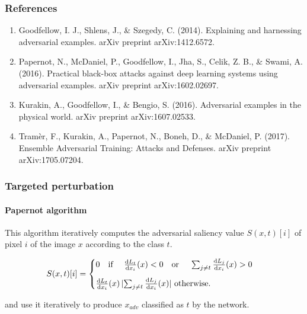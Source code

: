 \documentclass[9pt]{beamer}
\begin{document}
\begin{frame}
  \frametitle{References}

  {\footnotesize
    \begin{enumerate}
    \item Goodfellow, I. J., Shlens, J., \& Szegedy,
      C. (2014). Explaining and harnessing adversarial
      examples. arXiv preprint arXiv:1412.6572.
    \item Papernot, N., McDaniel, P., Goodfellow, I., Jha, S., Celik,
      Z. B., \& Swami, A. (2016). Practical black-box attacks against
      deep learning systems using adversarial examples. arXiv preprint
      arXiv:1602.02697.
    \item Kurakin, A., Goodfellow, I., \& Bengio,
      S. (2016). Adversarial examples in the physical world. arXiv
      preprint arXiv:1607.02533.
    \item Tramèr, F., Kurakin, A., Papernot, N., Boneh, D., \&
      McDaniel, P. (2017). Ensemble Adversarial Training: Attacks and
      Defenses. arXiv preprint arXiv:1705.07204.
    \end{enumerate}
  }

\end{frame}

\appendix

\begin{frame}
  \frametitle{Targeted perturbation}

  \framesubtitle{Papernot algorithm}

  This algorithm iteratively computes the adversarial saliency value
  $S(x, t)[i]$ of pixel $i$ of the image $x$ according to the class
  $t$.

  \medskip

  \[
  S(x, t)[i] =
  \begin{cases}
    0 \text{\quad if \quad} \frac{\mathrm{d} L_{t}}{\mathrm{d} x_{i}}(x) < 0
    \text{\quad or \quad} \sum_{j \neq t} \frac{\mathrm{d} L_{j}}{\mathrm{d} x_{i}}(x)
    > 0 \\[0.3cm]
    \frac{\mathrm{d} L_{t}}{\mathrm{d} x_{i}}(x) \, \lvert \sum_{j \neq
      t} \frac{\mathrm{d} L_{j}}{\mathrm{d} x_{i}}(x) \rvert \text{ otherwise.}
  \end{cases}
  \]

  \medskip

  and use it iteratively to produce $x_{adv}$ classified as $t$ by the
  network.

\end{frame}
\end{document}
